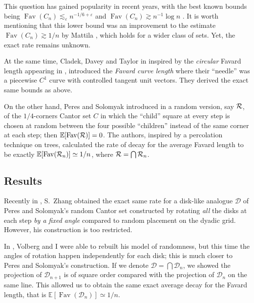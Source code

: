 \documentclass[11pt]{amsart} %
\theoremstyle{remark} %
\theoremstyle{definition} %
\numberwithin{equation}{section} %
\def \E{{\mathbb{E}}}	\def \K{{\mathbb{K}}}	\def \Q{{\mathbb{Q}}}	\def \W{{\mathbb{W}}}
\def \cD{{\mathcal{D}}}	\def \cJ{{\mathcal{J}}}	\def \cP{{\mathcal{P}}}	\def \cV{{\mathcal{V}}}
\newcommand{\0}[1]{\overline{#1}} %
\newcommand{\1}[1]{\tilde{#1}} %
\newcommand{\2}[1]{{}_{|#1}} %
\DeclareMathOperator{\Fav}{Fav} %
\begin{document}
This question has gained popularity in recent years, with the best known bounds being $\Fav(C_n)\lesssim_{ε} n^{-1/6+ε}$ \cite{NazPerVol2011} and $\Fav(C_n)\gtrsim n^{-1}\log n$ \cite{BatVol2010}. It is worth mentioning that this lower bound was an improvement to the estimate $\Fav(C_n)\gtrsim 1/n$ by Mattila \cite{Mat1990}, which holds for a wider class of sets. Yet, the exact rate remains unknown.

\medskip

At the same time, Cladek, Davey and Taylor in \cite{ClaDavTay2022} inspired by the \emph{circular} Favard length appearing in \cite{BonVol2010_circular_favard}, introduced the \emph{Favard curve length} where their ``needle'' was a piecewise $C^1$ curve with controlled tangent unit vectors. They derived the exact same bounds as above.

\smallskip

On the other hand, Peres and Solomyak introduced in \cite{PerSol2002} a random version, say ${\mathcal{R}}$, of the $1/4$-corners Cantor set $C$ in which the ``child'' square at every step is chosen at random between the four possible ``children'' instead of the same corner at each step; then $\E[\Fav(\cR)]=0$. The authors, inspired by a percolation technique on trees, calculated the rate of decay for the average Favard length to be exactly $\E[\Fav(\cR_n)]\simeq 1/n$, where ${\mathcal{R}}=\bigcap{\mathcal{R}}_n$.

\subsection*{Results}	%
Recently in \cite{Zha2019}, S.~Zhang obtained the exact same rate for a disk-like analogue $\cD$ of Peres and Solomyak's random Cantor set constructed by rotating \emph{all} the disks at each step \emph{by a fixed angle} compared to random placement on the dyadic grid. However, his construction is too restricted.

In \cite{VarVol2022ep}, Volberg and I were able to rebuilt his model of randomness, but this time the angles of rotation happen independently for each disk; this is much closer to Peres and Solomyak's construction. If we denote $\cD=\bigcap\cD_n$, we showed the projection of $\cD_{n+1}$ is of square order compared with the projection of $\cD_n$ on the same line. This allowed us to obtain the same exact average decay for the Favard length, that is $\E[\Fav(\cD_n)]\simeq 1/n$.
\end{document}

